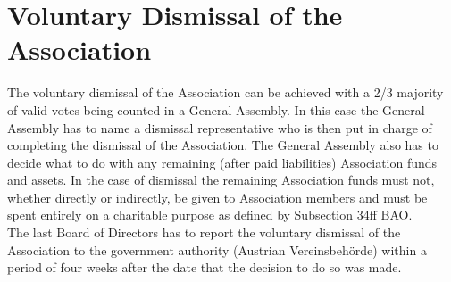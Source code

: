 \section{Voluntary Dismissal of the Association}

The voluntary dismissal of the Association can be achieved with a 2/3 majority of valid votes being counted in a General Assembly. In this case the General Assembly has to name a dismissal representative who is then put in charge of completing the dismissal of the Association. The General Assembly also has to decide what to do with any remaining (after paid liabilities) Association funds and assets. In the case of dismissal the remaining Association funds must not, whether directly or indirectly, be given to Association members and must be spent entirely on a charitable purpose as defined by Subsection 34ff BAO.\\

The last Board of Directors has to report the voluntary dismissal of the Association to the government authority (Austrian Vereinsbehörde) within a period of four weeks after the date that the decision to do so was made.


